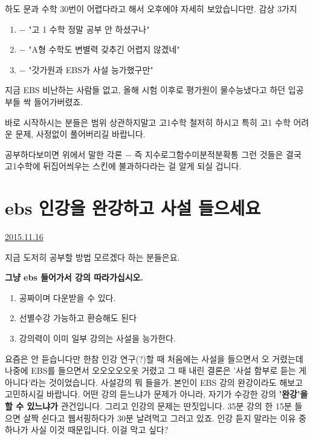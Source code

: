 하도 문과 수학 30번이 어렵다라고 해서 오후에야 자세히 보았습니다만.
감상 3가지
\vspace{5mm}

\begin{enumerate}
    \item $-$ "고 1 수학 정말 공부 안 하셨구나"
    \item $-$ "A형 수학도 변별력 갖추긴 어렵지 않겠네"
    \item $-$ "갓가원과 EBS가 사설 능가했구만"
\end{enumerate}
\vspace{5mm}

지금 EBS 비난하는 사람들 없고, 올해 시험 이후로 평가원이 물수능냈다고 하던 입공부들 싹 들어가버렸죠.
\vspace{5mm}

바로 시작하시는 분들은 범위 상관하지말고 고1수학 철저히 하시고
특히 고1 수학 어려운 문제, 사정없이 풀어버리길 바랍니다.
\vspace{5mm}

공부하다보미면 위에서 말한 각론 $-$ 즉 지수로그함수미분적분확통 그런 것들은
결국 고1수학에 뒤집어씌우는 스킨에 불과하다라는 걸 알게 되실 겁니다.
\vspace{5mm}






\section{ebs 인강을 완강하고 사설 들으세요}
\href{https://www.kockoc.com/Apoc/491239}{2015.11.16}

\vspace{5mm}

지금 도저히 공부할 방법 모르겠다 하는 분들은요.
\vspace{5mm}

\textbf{그냥 ebs 들어가서 강의 따라가십시오.}
\begin{enumerate}
    \item 공짜이며 다운받을 수 있다.    
    \item 선별수강 가능하고 환승해도 된다   
    \item 강의력이 이미 일부 강의는 사설을 능가한다.   
\end{enumerate}


요즘은 안 듣습니다만 한참 인강 연구(?)할 때    처음에는 사설을 들으면서 오 거렸는데   나중에 EBS를 들으면서 오오오오오옷 거렸고 그 때 내린 결론은 '사설 함부로 듣는 게 아니다'라는 것이었습니다.   사설강의 뭐 들을가.   본인이 EBS 강의 완강이라도 해보고 고민하시길 바랍니다.   어떤 강의 듣느냐가 문제가 아니라, 자기가 수강한 강의 \textbf{'완강'을 할 수 있느냐가} 관건입니다.   그리고 인강의 문제는 딴짓입니다. 35분 강의 한 15분 들으면 살짝 쉰다고 웹서핑하다가 30분 날려먹고 그러고 있죠.
인강 듣지 말라는 이유 중 하나가 사실 이것 때문입니다.
이걸 막고 싶다?
\vspace{5mm}


